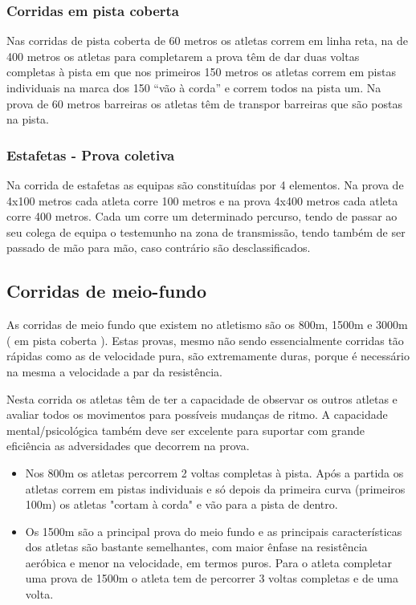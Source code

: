\documentclass{report}
\begin{document}
            \subsubsection{Corridas em pista coberta}
            Nas corridas de pista coberta de 60 metros os atletas correm em linha reta, na de 400 metros os atletas para completarem a prova têm de dar duas voltas completas à pista em que nos primeiros 150 metros os atletas correm em pistas individuais na marca dos 150 “vão à corda” e correm todos na pista um. Na prova de 60 metros barreiras os atletas têm de transpor barreiras que são postas na pista.
            \subsubsection{Estafetas - Prova coletiva}
            Na corrida de estafetas as equipas são constituídas por 4 elementos. Na prova de 4x100 metros cada atleta corre 100 metros e na prova 4x400 metros cada atleta corre 400 metros. Cada um corre um determinado percurso, tendo de passar ao seu colega de equipa o testemunho na zona de transmissão, tendo também de ser passado de mão para mão, caso contrário são desclassificados. \cite{velocidade}
            
    \hfill \newline
    \subsection{Corridas de meio-fundo}
    As corridas de meio fundo que existem no atletismo são os 800m, 1500m e 3000m ( em pista coberta ). Estas provas, mesmo não sendo essencialmente corridas tão rápidas como as de velocidade pura, são extremamente duras, porque é necessário na mesma a velocidade a par da resistência.  \par
    Nesta corrida os atletas têm de ter a capacidade de observar os outros atletas e avaliar todos os movimentos para possíveis mudanças de ritmo. A capacidade mental/psicológica também deve ser excelente para suportar com grande eficiência as adversidades que decorrem na prova.
    \begin{itemize}
        \item Nos 800m os atletas percorrem 2 voltas completas à pista. Após a partida os atletas correm em pistas individuais e só depois da primeira curva (primeiros 100m) os atletas "cortam à corda" e vão para a pista de dentro.
        \item Os 1500m são a principal prova do meio fundo e as principais características dos atletas são bastante semelhantes, com maior ênfase na resistência aeróbica e menor na velocidade, em termos puros. Para o atleta completar uma prova de 1500m o atleta tem de percorrer 3 voltas completas e  de uma volta.
    \end{itemize}
    
\end{document}
